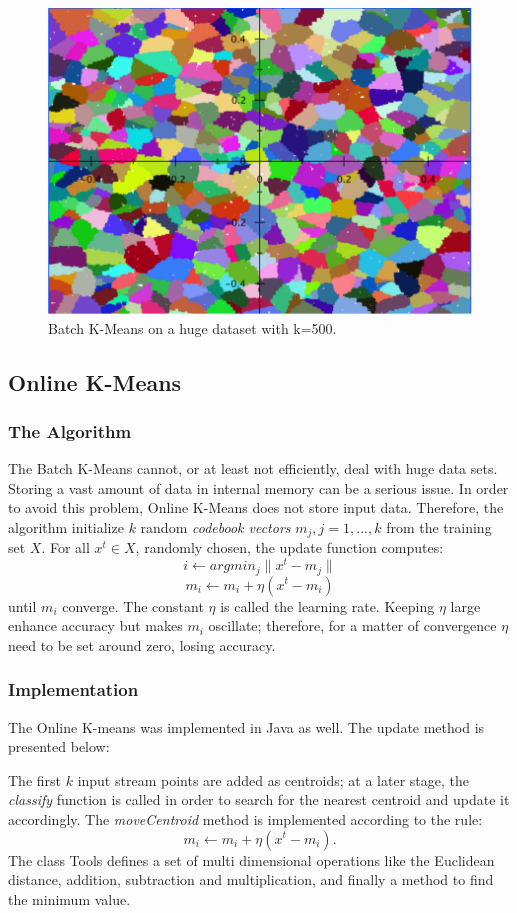 \documentclass{lmproj}
\begin{document}
\begin{figure}[ht]
	\centering
	\includegraphics[width=0.6\linewidth]{batchkm.png}
   \caption[BatchKM]{Batch K-Means on a huge dataset with k=500.}
\end{figure}


\subsection{Online K-Means}
\subsubsection{The Algorithm}
The Batch K-Means cannot, or at least not efficiently, deal with huge data sets. Storing a vast amount of data in internal memory can be a serious issue. In order to avoid this problem, Online K-Means\cite{Clustering} does not store input data. Therefore, the algorithm initialize $k$ random \textit{codebook vectors} $m_j,j=1,...,k$ from the training set $X$. For all $x^t \in X$, randomly chosen, the update function computes:  
\begin{equation}
i \longleftarrow arg min_j \parallel x^t - m_j \parallel
\end{equation}
\begin{equation}
m_i \longleftarrow m_i + \eta (x^t - m_i)
\end{equation}
until $m_i$ converge. The constant $\eta$ is called the learning rate. Keeping $\eta$ large enhance accuracy but makes $m_i$ oscillate; therefore, for a matter of convergence $\eta$ need to be set around zero, losing accuracy.

\subsubsection{Implementation}
The Online K-means was implemented in Java as well. The update method is presented below:

The first $k$ input stream points are added as centroids; at a later stage, the \textit{classify} function is called in order to search for the nearest centroid and update it accordingly.
The \textit{moveCentroid} method is implemented according to the rule: 
\begin{equation}
m_i \longleftarrow m_i + \eta (x^t - m_i).
\end{equation}
The class Tools defines a set of multi dimensional operations like the Euclidean distance, addition, subtraction and multiplication, and finally a method to find the minimum value. 

\end{document}
